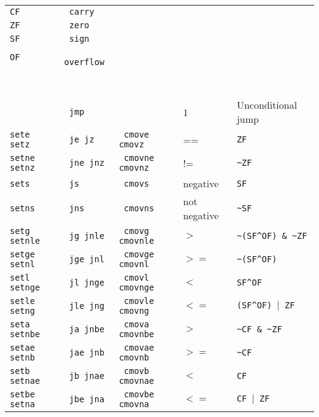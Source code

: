 \begin{center}
\tablefirsthead{}
\tablelasttail{}
\begin{supertabular}{>{\tt}l>{\tt}l>{\tt}m{80pt}m{60pt}m{100pt}}\toprule
CF & carry & \\
ZF & zero & \\
SF & sign & \\
OF & overflow & \\\midrule
{} & \\
 & \\\midrule
& jmp && 1 & Unconditional jump\\\cmidrule(lr){1-5}
sete setz & je jz & cmove cmovz & == & \texttt{ZF}\\
setne setnz & jne jnz & cmovne cmovnz & != & \texttt{\textasciitilde ZF}\\\cmidrule(lr){1-5}
sets & js & cmovs & negative & \texttt{SF}\\
setns & jns & cmovns & not negative & \texttt{\textasciitilde SF}\\\cmidrule(lr){1-5}
setg setnle & jg jnle & cmovg cmovnle & $>$ & \texttt{\textasciitilde (SF\^{}OF) \& \textasciitilde ZF}\\
setge setnl & jge jnl & cmovge cmovnl & $>=$ & \texttt{\textasciitilde (SF\^{}OF)}\\
setl setnge & jl jnge & cmovl cmovnge & $<$ & \texttt{SF\^{}OF}\\
setle setng & jle jng & cmovle cmovng & $<=$ & \texttt{(SF\^{}OF) $|$ ZF}\\\cmidrule(lr){1-5}
seta setnbe & ja jnbe & cmova cmovnbe & $>$ & \texttt{\textasciitilde CF \& \textasciitilde ZF}\\
setae setnb & jae jnb & cmovae cmovnb & $>=$ & \texttt{\textasciitilde CF}\\
setb setnae & jb jnae & cmovb cmovnae & $<$ & \texttt{CF}\\
setbe setna & jbe jna & cmovbe cmovna & $<=$ & \texttt{CF $|$ ZF}\\\bottomrule
\end{supertabular}
\end{center}

